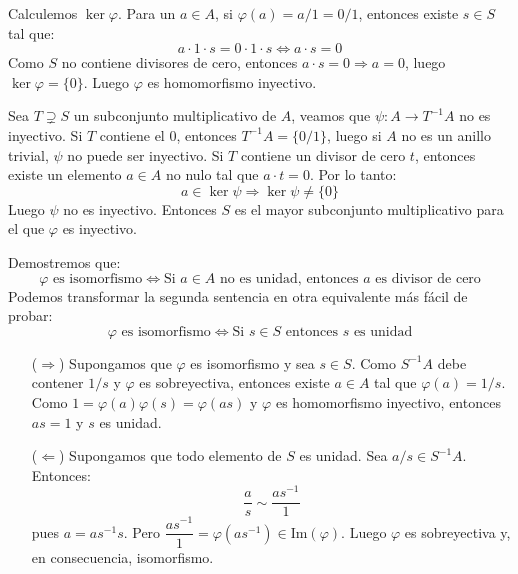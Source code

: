 \documentclass[twoside]{article}
\begin{document}
\begin{solucion}
Calculemos $\ker φ$. Para un $a \in A$, si $φ(a)=a/1=0/1$, entonces existe $s \in S$ tal que:
\[ a \cdot 1 \cdot s = 0 \cdot 1 \cdot s  \Leftrightarrow a \cdot s = 0 \]
Como $S$ no contiene divisores de cero, entonces $a \cdot s = 0 \Rightarrow a = 0$, luego $\ker φ = \{0\}$. Luego $φ$ es homomorfismo inyectivo.

Sea $T \supsetneq S$ un subconjunto multiplicativo de $A$, veamos que $ψ : A \to T^{-1}A$ no es inyectivo. Si $T$ contiene el $0$, entonces $T^{-1}A=\{0/1\}$, luego si $A$ no es un anillo trivial, $ψ$ no puede ser inyectivo. Si $T$ contiene un divisor de cero $t$, entonces existe un elemento $a \in A$ no nulo tal que $a\cdot t = 0$. Por lo tanto:
\[ a \in \ker ψ \Rightarrow \ker ψ \neq \{0\} \]
Luego $ψ$ no es inyectivo. Entonces $S$ es el mayor subconjunto multiplicativo para el que $φ$ es inyectivo.

Demostremos que:
\[ φ \text{ es isomorfismo} \Leftrightarrow \text{Si }a \in A \text{ no es unidad, entonces }a\text{ es divisor de cero} \]
Podemos transformar la segunda sentencia en otra equivalente más fácil de probar:
\[ φ \text{ es isomorfismo} \Leftrightarrow \text{Si }s \in S \text{ entonces }s\text{ es unidad} \]
\begin{itemize}
	\item[($\Rightarrow$)] Supongamos que $φ$ es isomorfismo y sea $s \in S$. Como $S^{-1}A$ debe contener $1/s$ y $φ$ es sobreyectiva, entonces existe $a \in A$ tal que $φ(a)=1/s$. Como $1=φ(a)φ(s)=φ(as)$ y $φ$ es homomorfismo inyectivo, entonces $as=1$ y $s$ es unidad.
	
	\item[($\Leftarrow$)] Supongamos que todo elemento de $S$ es unidad. Sea $a/s \in S^{-1}A$. Entonces:
	\[ \frac{a}{s} \sim \frac{as^{-1}}{1} \]
	pues $a=as^{-1}s$. Pero $\dfrac{as^{-1}}{1}=φ(as^{-1}) \in \text{Im}(φ)$. Luego $φ$ es sobreyectiva y, en consecuencia, isomorfismo.
\end{itemize}
\end{solucion}
\end{document}
